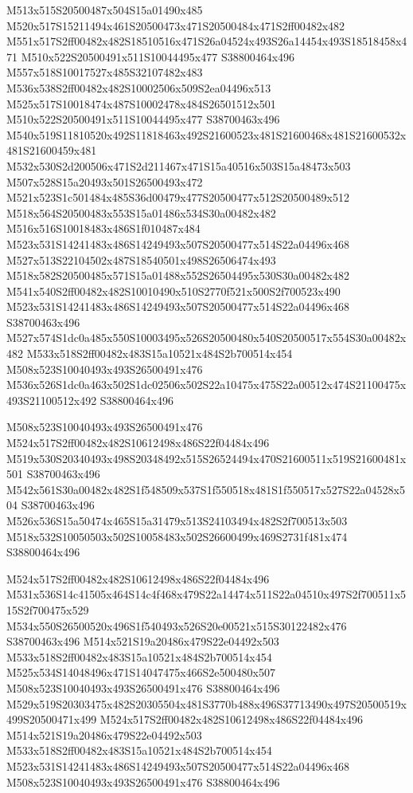 \documentclass{article}
\begin{document}
\begin{multicols}{2}
M513x515S20500487x504S15a01490x485 M520x517S15211494x461S20500473x471S20500484x471S2ff00482x482 M551x517S2ff00482x482S18510516x471S26a04524x493S26a14454x493S18518458x471 M510x522S20500491x511S10044495x477 S38800464x496 M557x518S10017527x485S32107482x483 M536x538S2ff00482x482S10002506x509S2ea04496x513 M525x517S10018474x487S10002478x484S26501512x501 M510x522S20500491x511S10044495x477 S38700463x496 M540x519S11810520x492S11818463x492S21600523x481S21600468x481S21600532x481S21600459x481 M532x530S2d200506x471S2d211467x471S15a40516x503S15a48473x503 M507x528S15a20493x501S26500493x472 M521x523S1c501484x485S36d00479x477S20500477x512S20500489x512 M518x564S20500483x553S15a01486x534S30a00482x482 M516x516S10018483x486S1f010487x484 M523x531S14241483x486S14249493x507S20500477x514S22a04496x468 M527x513S22104502x487S18540501x498S26506474x493 M518x582S20500485x571S15a01488x552S26504495x530S30a00482x482 M541x540S2ff00482x482S10010490x510S2770f521x500S2f700523x490 M523x531S14241483x486S14249493x507S20500477x514S22a04496x468 S38700463x496 M527x574S1dc0a485x550S10003495x526S20500480x540S20500517x554S30a00482x482 M533x518S2ff00482x483S15a10521x484S2b700514x454 M508x523S10040493x493S26500491x476 M536x526S1dc0a463x502S1dc02506x502S22a10475x475S22a00512x474S21100475x493S21100512x492 S38800464x496

M508x523S10040493x493S26500491x476 M524x517S2ff00482x482S10612498x486S22f04484x496 M519x530S20340493x498S20348492x515S26524494x470S21600511x519S21600481x501 S38700463x496 M542x561S30a00482x482S1f548509x537S1f550518x481S1f550517x527S22a04528x504 S38700463x496 M526x536S15a50474x465S15a31479x513S24103494x482S2f700513x503 M518x532S10050503x502S10058483x502S26600499x469S2731f481x474 S38800464x496

M524x517S2ff00482x482S10612498x486S22f04484x496 M531x536S14c41505x464S14c4f468x479S22a14474x511S22a04510x497S2f700511x515S2f700475x529 M534x550S26500520x496S1f540493x526S20e00521x515S30122482x476 S38700463x496 M514x521S19a20486x479S22e04492x503 M533x518S2ff00482x483S15a10521x484S2b700514x454 M525x534S14048496x471S14047475x466S2e500480x507 M508x523S10040493x493S26500491x476 S38800464x496 M529x519S20303475x482S20305504x481S3770b488x496S37713490x497S20500519x499S20500471x499 M524x517S2ff00482x482S10612498x486S22f04484x496 M514x521S19a20486x479S22e04492x503 M533x518S2ff00482x483S15a10521x484S2b700514x454 M523x531S14241483x486S14249493x507S20500477x514S22a04496x468 M508x523S10040493x493S26500491x476 S38800464x496


\end{multicols}
\end{document}
